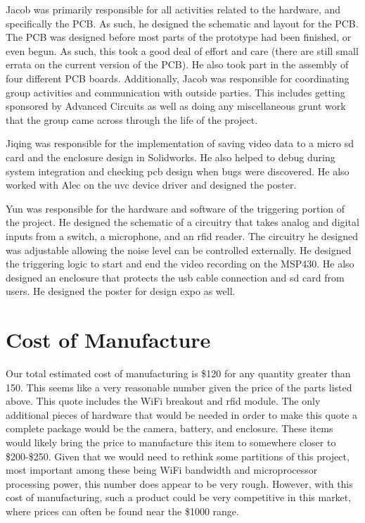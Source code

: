 \documentclass[12pt]{article}
\begin{document}
Jacob was primarily responsible for all activities related to the hardware, and
specifically the PCB. As such, he designed the schematic and layout for the
PCB. The PCB was designed before most parts of the prototype had been finished,
or even begun. As such, this took a good deal of effort and care (there are
still small errata on the current version of the PCB). He also took part in the
assembly of four different PCB boards. Additionally, Jacob was responsible for
coordinating group activities and communication with outside parties. This
includes getting sponsored by Advanced Circuits as well as doing any
miscellaneous grunt work that the group came across through the life of the
project.

Jiqing was responsible for the implementation of saving video data to a micro
\gls{sd} card and the enclosure design in Solidworks. He also helped to debug
during system integration and checking \gls{pcb} design when bugs were
discovered.  He also worked with Alec on the \gls{uvc} device driver and
designed the poster.

Yun was responsible for the hardware and software of the triggering portion of
the project. He designed the schematic of a circuitry that takes analog and
digital inputs from a switch, a microphone, and an \gls{rfid} reader. The
circuitry he designed was adjustable allowing the noise level can be controlled
externally.  He designed the triggering logic to start and end the video
recording on the MSP430. He also designed an enclosure that protects the
\gls{usb} cable connection and \gls{sd} card from users. He designed the poster
for design expo as well.

\section{Cost of Manufacture}
Our total estimated cost of manufacturing is \$120 for any quantity greater
than 150. This seems like a very reasonable number given the price of the parts
listed above. This quote includes the WiFi breakout and \gls{rfid} module. The
only additional pieces of hardware that would be needed in order to make this
quote a complete package would be the camera, battery, and enclosure. These
items would likely bring the price to manufacture this item to somewhere closer
to \$200-\$250. Given that we would need to rethink some partitions of this
project, most important among these being WiFi bandwidth and microprocessor
processing power, this number does appear to be very rough. However, with this
cost of manufacturing, such a product could be very competitive in this market,
where prices can often be found near the \$1000 range.
\end{document}

